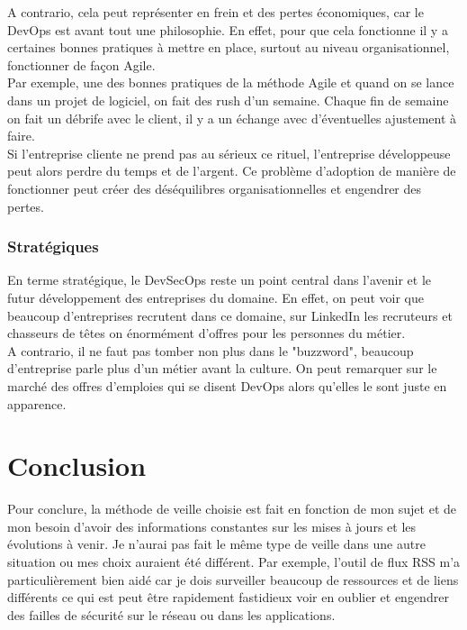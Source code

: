 \documentclass[11pt,a4paper,oneside]{book}
\begin{document}
A contrario, cela peut représenter en frein et des pertes économiques, car le DevOps est avant tout une philosophie. 
En effet, pour que cela fonctionne il y a certaines bonnes pratiques à mettre en place, surtout au niveau organisationnel, fonctionner de façon Agile. \\
Par exemple, une des bonnes pratiques de la méthode Agile et quand on se lance dans un projet de logiciel, on fait des rush d'un semaine. Chaque fin de semaine on fait un débrife avec le client, il y a un échange avec d'éventuelles ajustement à faire. \\
Si l'entreprise cliente ne prend pas au sérieux ce rituel, l'entreprise développeuse peut alors perdre du temps et de l'argent.
Ce problème d'adoption de manière de fonctionner peut créer des déséquilibres organisationnelles et engendrer des pertes.

\subsection{Stratégiques}

En terme stratégique, le DevSecOps reste un point central dans l'avenir et le futur développement des entreprises du domaine.
En effet, on peut voir que beaucoup d'entreprises recrutent dans ce domaine, sur LinkedIn les recruteurs et chasseurs de têtes on énormément d'offres pour les personnes du métier. \\

A contrario, il ne faut pas tomber non plus dans le "buzzword", beaucoup d'entreprise parle plus d'un métier avant la culture. On peut remarquer sur le marché des offres d'emploies qui se disent DevOps alors qu'elles le sont juste en apparence.


\chapter{Conclusion}

Pour conclure, la méthode de veille choisie est fait en fonction de mon sujet et de mon besoin d'avoir des informations constantes sur les mises à jours et les évolutions à venir. Je n'aurai pas fait le même type de veille dans une autre situation ou mes choix auraient été différent.
Par exemple, l'outil de flux RSS m'a particulièrement bien aidé car je dois surveiller beaucoup de ressources et de liens différents ce qui est peut être rapidement fastidieux voir en oublier et engendrer des failles de sécurité sur le réseau ou dans les applications. \\
\end{document}
